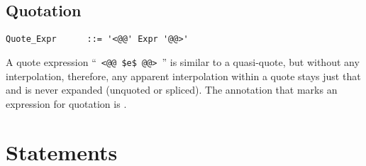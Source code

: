 \subsection{Quotation}
\label{sec:quotation}

\grammar\begin{lstlisting}
Quote_Expr      ::= '<@@' Expr '@@>'
\end{lstlisting}

A quote expression ``~\lstinline!<@@ $e$ @@>!~'' is similar to a quasi-quote, but without any interpolation, therefore, any apparent interpolation within a quote stays just that and is never expanded (unquoted or spliced). The annotation that marks an expression for quotation is . 





\section{Statements}
\label{sec:statements}

